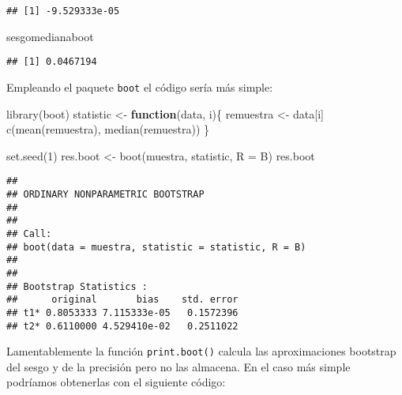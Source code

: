\documentclass[
]{book}
\newenvironment{Shaded}{\begin{snugshade}}{\end{snugshade}}
\newcommand{\AttributeTok}[1]{\textcolor[rgb]{0.77,0.63,0.00}{#1}}
\newcommand{\ControlFlowTok}[1]{\textcolor[rgb]{0.13,0.29,0.53}{\textbf{#1}}}
\newcommand{\DecValTok}[1]{\textcolor[rgb]{0.00,0.00,0.81}{#1}}
\newcommand{\FunctionTok}[1]{\textcolor[rgb]{0.00,0.00,0.00}{#1}}
\newcommand{\NormalTok}[1]{#1}
\newcommand{\OtherTok}[1]{\textcolor[rgb]{0.56,0.35,0.01}{#1}}
\theoremstyle{break}
\theoremstyle{definition}
\theoremstyle{definition}
\theoremstyle{definition}
\theoremstyle{definition}
\theoremstyle{remark}
\begin{document}
\begin{verbatim}
## [1] -9.529333e-05
\end{verbatim}

\begin{Shaded}
\begin{Highlighting}[]
\NormalTok{sesgomedianaboot}
\end{Highlighting}
\end{Shaded}

\begin{verbatim}
## [1] 0.0467194
\end{verbatim}

Empleando el paquete \texttt{boot} el código sería más simple:

\begin{Shaded}
\begin{Highlighting}[]
\FunctionTok{library}\NormalTok{(boot)}
\NormalTok{statistic }\OtherTok{\textless{}{-}} \ControlFlowTok{function}\NormalTok{(data, i)\{}
\NormalTok{  remuestra }\OtherTok{\textless{}{-}}\NormalTok{ data[i]}
  \FunctionTok{c}\NormalTok{(}\FunctionTok{mean}\NormalTok{(remuestra), }\FunctionTok{median}\NormalTok{(remuestra))}
\NormalTok{\}}

\FunctionTok{set.seed}\NormalTok{(}\DecValTok{1}\NormalTok{)}
\NormalTok{res.boot }\OtherTok{\textless{}{-}} \FunctionTok{boot}\NormalTok{(muestra, statistic, }\AttributeTok{R =}\NormalTok{ B)}
\NormalTok{res.boot}
\end{Highlighting}
\end{Shaded}

\begin{verbatim}
## 
## ORDINARY NONPARAMETRIC BOOTSTRAP
## 
## 
## Call:
## boot(data = muestra, statistic = statistic, R = B)
## 
## 
## Bootstrap Statistics :
##      original       bias    std. error
## t1* 0.8053333 7.115333e-05   0.1572396
## t2* 0.6110000 4.529410e-02   0.2511022
\end{verbatim}

Lamentablemente la función \texttt{print.boot()} calcula las aproximaciones
bootstrap del sesgo y de la precisión pero no las almacena.
En el caso más simple podríamos obtenerlas con el siguiente código:
\end{document}
